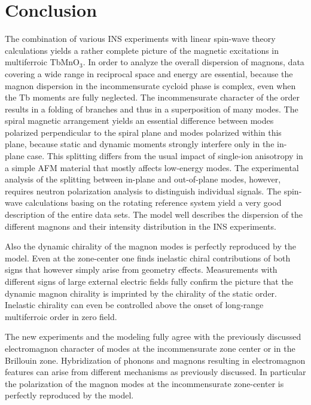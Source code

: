 \documentclass[aps,prb,twocolumn,superscriptaddress,showpacs,floatfix]{revtex4-2}
\begin{document}
\section{Conclusion}

The combination of various INS experiments with linear spin-wave theory calculations yields a rather complete picture of the magnetic excitations in multiferroic TbMnO$_3$.
In order to analyze the overall dispersion of magnons, data covering a wide range in reciprocal space and energy are essential, because the magnon dispersion in the incommensurate cycloid phase is complex, even when the Tb moments are fully neglected. The incommensurate character of the order results in a folding of branches and thus in a superposition of many modes.
The spiral magnetic arrangement yields an essential difference between modes polarized perpendicular to the spiral plane and modes polarized within this plane, because static and dynamic moments strongly interfere only in the in-plane case.
This splitting differs from the usual impact of single-ion anisotropy in a simple AFM material that mostly affects low-energy modes.
The experimental analysis of the splitting between in-plane and out-of-plane modes, however, requires neutron polarization analysis to distinguish individual signals.
The spin-wave calculations basing on the rotating reference system yield a very good description of the entire data sets.
The model well describes the dispersion of the different magnons and their
intensity distribution in the INS experiments.

Also the dynamic chirality of the magnon modes is perfectly reproduced by the model. 
Even at the zone-center one finds inelastic chiral contributions
of both signs that however simply arise from geometry effects. 
Measurements with different signs of large external electric fields fully confirm
the picture that the dynamic magnon chirality is imprinted by the chirality of the static order. 
Inelastic chirality can even be controlled above
the onset of long-range multiferroic order in zero field.

The new experiments and the modeling fully agree with the previously discussed electromagnon character of modes at the incommensurate zone center or in the Brillouin zone. Hybridization of phonons and
magnons resulting in electromagnon features can arise from different mechanisms as previously discussed. In particular the polarization of the magnon modes at the incommensurate zone-center is perfectly reproduced by the model.
\end{document}
